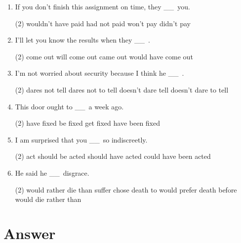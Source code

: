 \documentclass{yufa}
\newcommand\ttu{ \_\_\ }
\begin{document}
\begin{enumerate}
\item If you don't finish this assignment on time, they \ttu you.
  \begin{tasks}(2)
    \task wouldn't have paid
    \task had not paid
    \task won't pay
    \task didn't pay
  \end{tasks}

\item I'll let you know the results when they \ttu.
  \begin{tasks}(2)
    \task come out
    \task will come out
    \task came out
    \task would have come out
  \end{tasks}

\item I'm not worried about security because I think he \ttu.
  \begin{tasks}(2)
    \task dares not tell
    \task dares not to tell
    \task doesn't dare tell
    \task doesn't dare to tell
  \end{tasks}

\item This door ought to \ttu a week ago.
  \begin{tasks}(2)
    \task have fixed
    \task be fixed
    \task get fixed
    \task have been fixed
  \end{tasks}

\item I am surprised that you \ttu so indiscreetly.
  \begin{tasks}(2)
    \task act
    \task should be acted
    \task should have acted
    \task could have been acted
  \end{tasks}

\item He said he \ttu disgrace.
  \begin{tasks}(2)
    \task would rather die than suffer
    \task chose death to
    \task would prefer death before
    \task would die rather than
  \end{tasks}

\end{enumerate}

\section{Answer}
\end{document}

